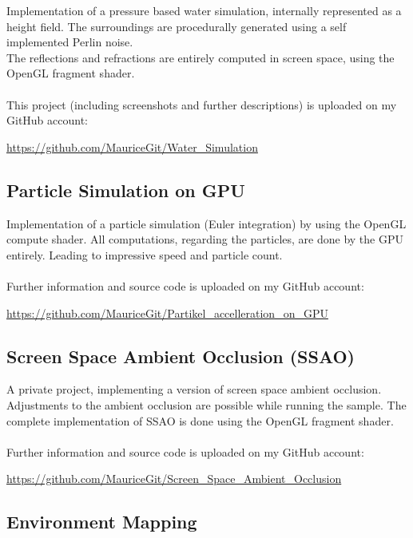 \documentclass[a4paper, 12pt]{article}
\begin{document}
Implementation of a pressure based water simulation, internally represented as a height field.
The surroundings are procedurally generated using a self implemented Perlin noise.
\\
The reflections and refractions are entirely computed in screen space, using the OpenGL fragment
shader.
\\
\\
This project (including screenshots and further descriptions) is uploaded on my GitHub account:

\begin{center}
	\url{https://github.com/MauriceGit/Water_Simulation}
\end{center}

\subsection{Particle Simulation on GPU}

Implementation of a particle simulation (Euler integration) by using the OpenGL compute shader.
All computations, regarding the particles, are done by the GPU entirely. Leading to impressive 
speed and particle count.
\\
\\
Further information and source code is uploaded on my GitHub account:

\begin{center}
	\url{https://github.com/MauriceGit/Partikel_accelleration_on_GPU}
\end{center}

\subsection{Screen Space Ambient Occlusion (SSAO)}

A private project, implementing a version of screen space ambient occlusion. Adjustments to the ambient 
occlusion are possible while running the sample. The complete implementation of SSAO is done using the
OpenGL fragment shader.
\\
\\
Further information and source code is uploaded on my GitHub account:

\begin{center}
	\url{https://github.com/MauriceGit/Screen_Space_Ambient_Occlusion}
\end{center}

\subsection{Environment Mapping}
\end{document}
